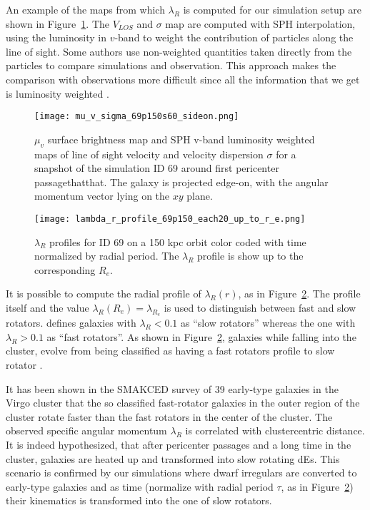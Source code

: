 An example of the maps from which $\lambda_R$ is computed for our simulation setup are shown in Figure~\ref{fig:maps_lambda_r}.
The $V_{LOS}$ and $\sigma$ map are computed with SPH interpolation, using the luminosity in $v$-band to weight the contribution of particles along the line of sight.
Some authors \citep[e.g.][]{Schulze2018,Pillepich2019} use non-weighted quantities taken directly from the particles to compare simulations and observation.%
This approach makes the comparison with observations more difficult since all the information that we get is luminosity weighted \citep{Walo-Martin2020}.

\begin{figure}
\centering
\texttt{[image: mu\_v\_sigma\_69p150s60\_sideon.png]}
\caption{$\mu_v$ surface brightness map and SPH v-band luminosity weighted maps of line of sight velocity and velocity dispersion $\sigma$ for a snapshot of the simulation ID 69 around first pericenter passagethatthat.
The galaxy is projected edge-on, with the angular momentum vector lying on the $xy$ plane.}
\label{fig:maps_lambda_r}
\end{figure}

\begin{figure}
\centering
\texttt{[image: lambda\_r\_profile\_69p150\_each20\_up\_to\_r\_e.png]}
\caption{$\lambda_R$ profiles for ID 69 on a 150 kpc orbit color coded with time normalized by radial period. The $\lambda_R$ profile is show up to the corresponding $R_e$.}
\label{fig:lambda_r_profile}
\end{figure}

It is possible to compute the radial profile of $\lambda_R(r)$, as in Figure~\ref{fig:lambda_r_profile}.
The profile itself and the value $\lambda_R(R_e) = \lambda_{R_e}$ is used to distinguish between fast and slow rotators.
\citet{Emsellem2007} defines galaxies with $\lambda_R < 0.1$ as ``slow rotators'' whereas the one with $\lambda_R>0.1$ as ``fast rotators''.
As shown in Figure~\ref{fig:lambda_r_profile}, galaxies while falling into the cluster, evolve from being classified as having a fast rotators profile to slow rotator \citep[cf.][]{Emsellem2011}.


It has been shown in the \textsc{SMAKCED} survey of 39 early-type galaxies in the Virgo cluster \citep{Toloba2014, Toloba2015} that the so classified fast-rotator galaxies in the outer region of the cluster rotate faster than the fast rotators in the center of the cluster.
The observed specific angular momentum $\lambda_R$ is correlated with clustercentric distance. %
It is indeed hypothesized, that after pericenter passages and a long time in the cluster, galaxies are heated up and transformed into slow rotating dEs.
This scenario is confirmed by our simulations where dwarf irregulars are converted to early-type galaxies and as time (normalize with radial period $\tau$, as in Figure~\ref{fig:lambda_r_profile}) their kinematics is transformed into the one of slow rotators.


